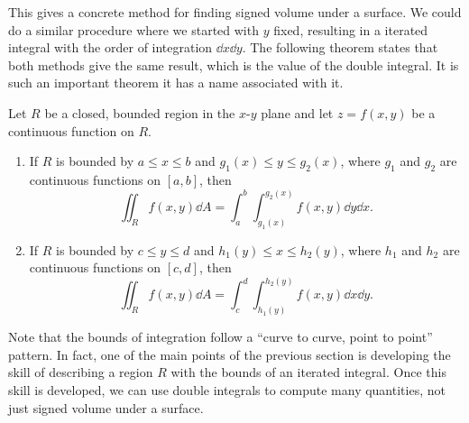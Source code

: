 This gives a concrete method for finding signed volume under a surface. We could do a similar procedure where we started with $y$ fixed, resulting in a iterated integral with the order of integration $\dd x\dd y$. The following theorem states that both methods give the same result, which is the value of the double integral. It is such an important theorem it has a name associated with it.

\begin{theorem}\label{thm:fubini}%
Let $R$ be a closed, bounded region in the $x$-$y$ plane and let $z=f(x,y)$ be a continuous function on $R$.%
\begin{enumerate}
	\item If $R$ is bounded by $a\leq x\leq b$ and $g_1(x)\leq y\leq g_2(x)$, where $g_1$ and $g_2$ are continuous functions on $[a,b]$, then
	\[\iint_R f(x,y)\dd A = \int_a^b\int_{g_1(x)}^{g_2(x)} f(x,y)\dd y\dd x.\]
	
	\item If $R$ is bounded by $c\leq y\leq d$ and $h_1(y)\leq x\leq h_2(y)$, where $h_1$ and $h_2$ are continuous functions on $[c,d]$, then
	\[\iint_R f(x,y)\dd A = \int_c^d\int_{h_1(y)}^{h_2(y)} f(x,y)\dd x\dd y.\]
\end{enumerate}
\end{theorem}

Note that the bounds of integration follow a ``curve to curve, point to point'' pattern. In fact, one of the main points of the previous section is developing the skill of describing a region $R$ with the bounds of an iterated integral. Once this skill is developed, we can use double integrals to compute many quantities, not just signed volume under a surface.


